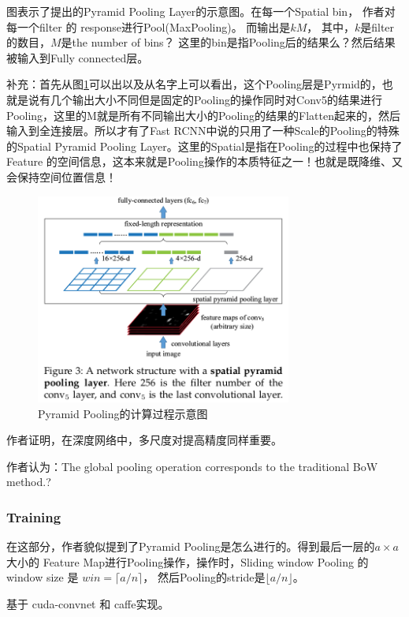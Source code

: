 图表示了提出的Pyramid Pooling Layer的示意图。在每一个Spatial bin， 作者对每一个filter 的 response进行Pool(MaxPooling)。 而输出是$kM$， 其中，$k$是filter的数目，$M$是the number of bins？ 这里的bin是指Pooling后的结果么？然后结果被输入到Fully connected层。

补充：首先从图\ref{SPPNet1}可以出以及从名字上可以看出，这个Pooling层是Pyrmid的，也就是说有几个输出大小不同但是固定的Pooling的操作同时对Conv5的结果进行Pooling，这里的M就是所有不同输出大小的Pooling的结果的Flatten起来的，然后输入到全连接层。所以才有了Fast RCNN中说的只用了一种Scale的Pooling的特殊的Spatial Pyramid Pooling Layer。这里的Spatial是指在Pooling的过程中也保持了Feature 的空间信息，这本来就是Pooling操作的本质特征之一！也就是既降维、又会保持空间位置信息！

\begin{figure}[!hbtp]
\centering
\includegraphics[width=0.75\textwidth]{FeatureExtraction/SPPNet1.png}
\caption{Pyramid Pooling的计算过程示意图}
\label{SPPNet1}
\end{figure}

作者证明，在深度网络中，多尺度对提高精度同样重要。

作者认为：The global pooling operation corresponds to the traditional BoW method.?

\subsubsection{Training}

在这部分，作者貌似提到了Pyramid Pooling是怎么进行的。得到最后一层的$a \times a$ 大小的 Feature Map进行Pooling操作，操作时，Sliding window Pooling 的 window size 是 $win = \lceil a / n \rceil$， 然后Pooling的stride是$\lfloor a / n \rfloor$。

基于 cuda-convnet 和 caffe实现。

